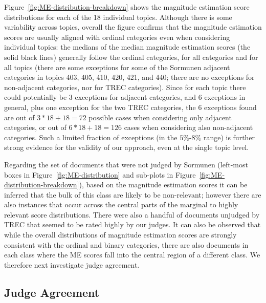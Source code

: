 Figure~\ref{fig:ME-distribution-breakdown} shows the magnitude
estimation score distributions for
each of the 18 individual topics. 
Although there is some variability across topics, overall the figure
confirms that the magnitude estimation scores are usually aligned with
ordinal categories even when considering individual topics: the
medians of the median magnitude estimation scores (the solid black
lines) generally follow the ordinal categories, for all categories and
for all topics (there are some exceptions for some of the Sormunen
adjacent categories in topics 403, 405, 410, 420, 421, and 440; there
are no exceptions for non-adjacent categories, nor for TREC
categories). 
Since for each topic there could potentially be 3 exceptions for
adjacent categories, and 6 exceptions in general, plus one exception
for the two TREC categories, the 6 exceptions found are out of
$3 * 18 + 18 = 72$ possible cases when considering only adjacent
categories, or out of $6 * 18 + 18 = 126$ cases when considering also
non-adjacent categories. 
Such a limited fraction of exceptions (in the $5\%$-$8\%$ range) is
further strong evidence for the validity of our
approach, even at the single topic level.

Regarding the set of documents that were not judged by Sormunen
(left-most boxes in Figure~\ref{fig:ME-distribution} and sub-plots in
Figure~\ref{fig:ME-distribution-breakdown}), based on the magnitude
estimation scores it can be inferred that the bulk of this class are
likely to be non-relevant; however there are also instances that occur
across the central parts of the marginal to highly relevant score
distributions. There were also a handful of documents unjudged by 
TREC that seemed to be rated highly by our judges.
It can also be observed that while the overall distributions of
magnitude estimation scores are strongly consistent with the ordinal
and binary categories, there are also documents in each class 
where the ME scores 
fall into the central region of a different class.
We therefore next investigate judge agreement.


\subsection{Judge Agreement}
\label{sec:judge-agreement}


